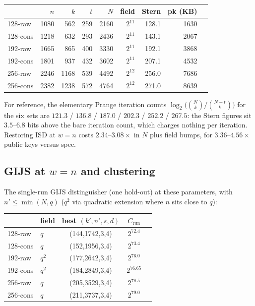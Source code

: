 \begin{center}
    \begin{tabular}{lrrrrrrrr}
        \toprule
                 & $n$  & $k$  & $t$ & $N$  & field    & Stern & pk (KB) \\
        \midrule
        128-raw  & 1080 & 562  & 259 & 2160 & $2^{11}$ & 128.1 & 1630    \\
        128-cons & 1218 & 632  & 293 & 2436 & $2^{11}$ & 143.1 & 2067    \\
        192-raw  & 1665 & 865  & 400 & 3330 & $2^{11}$ & 192.1 & 3868    \\
        192-cons & 1801 & 937  & 432 & 3602 & $2^{11}$ & 207.1 & 4532    \\
        256-raw  & 2246 & 1168 & 539 & 4492 & $2^{12}$ & 256.0 & 7686    \\
        256-cons & 2382 & 1238 & 572 & 4764 & $2^{12}$ & 271.0 & 8639    \\
        \bottomrule
    \end{tabular}
\end{center}
For reference, the elementary Prange iteration counts
$\log_2\bigl(\binom{N}{k}/\binom{N-t}{k}\bigr)$ for the six sets are
$121.3$ / $136.8$ / $187.0$ / $202.3$ / $252.2$ / $267.5$: the Stern
figures sit $3.5$--$6.8$ bits above the bare iteration count, which
charges nothing per iteration.
Restoring ISD at $w=n$ costs $2.34$--$3.08\times$ in $N$ plus field bumps, for
$3.36$--$4.56\times$ public keys versus spec.

\subsection{GIJS at $w=n$ and clustering}\label{sec:wn-recovery}

The single-run GIJS distinguisher (one hold-out) at these parameters, with
$n'\leq\min(N,q)$ ($q^2$ via quadratic extension where $n$ sits close to $q$):
\begin{center}
    \begin{tabular}{llccc}
        \toprule
                 & field & best $(k',n',s,d)$ & $C_{\mathrm{run}}$ \\
        \midrule
        128-raw  & $q$   & (144,1742,3,4)     & $2^{72.4}$         \\
        128-cons & $q$   & (152,1956,3,4)     & $2^{73.4}$         \\
        192-raw  & $q^2$ & (177,2642,3,4)     & $2^{76.0}$         \\
        192-cons & $q^2$ & (184,2849,3,4)     & $2^{76.65}$        \\
        256-raw  & $q$   & (205,3529,3,4)     & $2^{78.5}$         \\
        256-cons & $q$   & (211,3737,3,4)     & $2^{79.0}$         \\
        \bottomrule
    \end{tabular}
\end{center}

